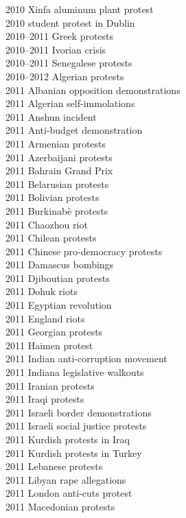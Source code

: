 2010 Xinfa aluminum plant protest\\
2010 student protest in Dublin\\
2010–2011 Greek protests\\
2010–2011 Ivorian crisis\\
2010–2011 Senegalese protests\\
2010–2012 Algerian protests\\
2011 Albanian opposition demonstrations\\
2011 Algerian self-immolations\\
2011 Anshun incident\\
2011 Anti-budget demonstration\\
2011 Armenian protests\\
2011 Azerbaijani protests\\
2011 Bahrain Grand Prix\\
2011 Belarusian protests\\
2011 Bolivian protests\\
2011 Burkinabè protests\\
2011 Chaozhou riot\\
2011 Chilean protests\\
2011 Chinese pro-democracy protests\\
2011 Damascus bombings\\
2011 Djiboutian protests\\
2011 Dohuk riots\\
2011 Egyptian revolution\\
2011 England riots\\
2011 Georgian protests\\
2011 Haimen protest\\
2011 Indian anti-corruption movement\\
2011 Indiana legislative walkouts\\
2011 Iranian protests\\
2011 Iraqi protests\\
2011 Israeli border demonstrations\\
2011 Israeli social justice protests\\
2011 Kurdish protests in Iraq\\
2011 Kurdish protests in Turkey\\
2011 Lebanese protests\\
2011 Libyan rape allegations\\
2011 London anti-cuts protest\\
2011 Macedonian protests\\
